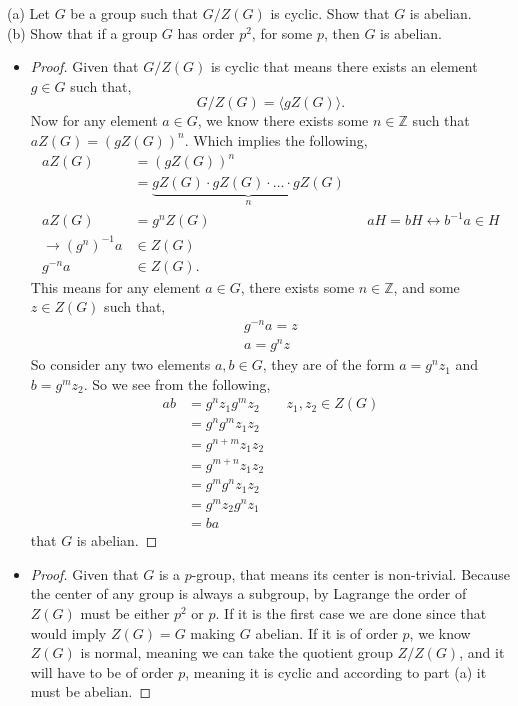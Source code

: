 \documentclass[11pt]{article}
\newenvironment{problem}[2][Problem\!]{\begin{trivlist}
\item[\hskip \labelsep {\bfseries #1}\hskip \labelsep {\bfseries #2}]}{\end{trivlist}}
\newcommand{\zz}{\mathbb Z}   %
\begin{document}
\begin{tcolorbox}
  \begin{problem} {5.3} $ $\\
    (a) Let $G$ be a group such that $G/Z(G)$ is cyclic. Show that $G$ is abelian.\\
    (b) Show that if a group $G$ has order $p^{2}$, for some $p$, then $G$ is abelian.
  \end{problem}
\end{tcolorbox}
\begin{itemize}
  \item[(a)] \begin{proof}
    Given that $G/Z(G)$ is cyclic that means there exists an element $g\in G$ such that,
    \[G/Z(G) = \langle gZ(G)\rangle.\]
    Now for any element $a\in G$, we know there exists some $n\in \zz$ such that $aZ(G) =(gZ(G))^{n}$. Which implies the following,
    \begin{align*}
      aZ(G) &= (gZ(G))^{n} \\
       &= \underbrace{gZ(G) \cdot gZ(G) \cdot \dots \cdot gZ(G)}_n \\
      aZ(G) &= g^{n}Z(G) && aH = bH \longleftrightarrow b^{-1}a\in H \\
      \rightarrow(g^{n})^{-1}a &\in Z(G) \\
      g^{-n}a &\in Z(G).
    \end{align*}
    This means for any element $a\in G$, there exists some $n\in \zz$, and some $z\in Z(G)$ such that,
    \begin{align*}
      g^{-n}a = z \\
      a = g^{n}z
    \end{align*}
    So consider any two elements $a,b \in G$, they are of the form $a = g^{n}z_1$ and $b = g^{m}z_2$. So we see from the following,
    \begin{align*}
      ab &= g^{n}z_1g^{m}z_2 && z_1,z_2 \in Z(G) \\
      &=g^{n}g^{m}z_1z_2 \\
      &= g^{n + m}z_1 z_2 \\
      &= g^{m+n}z_1z_2 \\
      &= g^{m}g^{n}z_1z_2 \\
      &= g^{m}z_2g^{n}z_1 \\
      &= ba
    \end{align*}
    that $G$ is abelian. 
  \end{proof}
  \item[(b)] \begin{proof}
    Given that $G$ is a $p$-group, that means its center is non-trivial. Because the center of any group is always a subgroup, by Lagrange the order of $Z(G)$ must be either $p^{2}$ or $p$. If it is the first case we are done since that would imply $Z(G) = G$ making $G$ abelian. If it is of order $p$, we know $Z(G)$ is normal, meaning we can take the quotient group $Z/Z(G)$, and it will have to be of order $p$, meaning it is cyclic and according to part (a) it must be abelian. 
  \end{proof}
\end{itemize}
\end{document}
